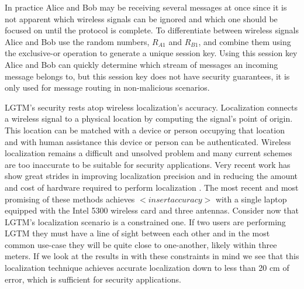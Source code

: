 \documentclass[12pt]{report}
\begin{document}
In practice Alice and Bob may be receiving several messages at once since it is not apparent which wireless signals can be ignored and which one should be focused on until the protocol is complete. To differentiate between wireless signals Alice and Bob use the random numbers, $R_{A1}$ and $R_{B1}$, and combine them using the exclusive-or operation to generate a unique session key. Using this session key Alice and Bob can quickly determine which stream of messages an incoming message belongs to, but this session key does not have security guarantees, it is only used for message routing in non-malicious scenarios. \par

LGTM's security rests atop wireless localization's accuracy. Localization connects a wireless signal to a physical location by computing the signal's point of origin. This location can be matched with a device or person occupying that location and with human assistance this device or person can be authenticated. Wireless localization remains a difficult and unsolved problem and many current schemes are too inaccurate to be suitable for security applications. Very recent work has show great strides in improving localization precision and in reducing the amount and cost of hardware required to perform localization \cite{UbicarseKumar2014,SpotFiKotaru2015,ChronosSingleAPLocalizationVasisht2016}. The most recent and most promising of these methods \cite{ChronosSingleAPLocalizationVasisht2016} achieves $<insert accuracy>$ with a single laptop equipped with the Intel 5300 wireless card and three antennas. Consider now that LGTM's localization scenario is a constrained one. If two users are performing LGTM they must have a line of sight between each other and in the most common use-case they will be quite close to one-another, likely within three meters. If we look at the results in \cite{ChronosSingleAPLocalizationVasisht2016} with these constraints in mind we see that this localization technique achieves accurate localization down to less than 20 cm of error, which is sufficient for security applications. \par
\end{document}
